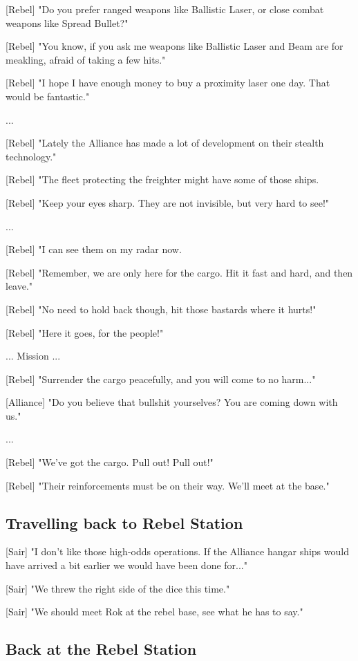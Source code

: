 \documentclass[a4paper,12pt]{article}
\begin{document}
[Rebel] "Do you prefer ranged weapons like Ballistic Laser, or close combat
weapons like Spread Bullet?" 

[Rebel] "You know, if you ask me weapons like Ballistic Laser and Beam
are for meakling, afraid of taking a few hits."

[Rebel] "I hope I have enough money to buy a proximity laser one day. That would be fantastic."

...

[Rebel] "Lately the Alliance has made a lot of development on their stealth technology."

[Rebel] "The fleet protecting the freighter might have some of those ships. 

[Rebel] "Keep your eyes sharp. They are not invisible, but very hard to see!"

...

[Rebel] "I can see them on my radar now. 

[Rebel] "Remember, we are only here for the cargo. Hit it fast and hard, and then leave."

[Rebel] "No need to hold back though, hit those bastards where it hurts!"

[Rebel] "Here it goes, for the people!"

... Mission ...

[Rebel] "Surrender the cargo peacefully, and you will come to no harm..."

[Alliance] "Do you believe that bullshit yourselves? You are coming down with us."

...

[Rebel] "We've got the cargo. Pull out! Pull out!" 

[Rebel] "Their reinforcements must be on their way. We'll meet at the base."

\subsection{Travelling back to Rebel Station}

[Sair] "I don't like those high-odds operations. If the Alliance hangar ships would have
arrived a bit earlier we would have been done for..."

[Sair] "We threw the right side of the dice this time." 

[Sair] "We should meet Rok at the rebel base, see what he has to say."

\subsection{Back at the Rebel Station}
\end{document}
